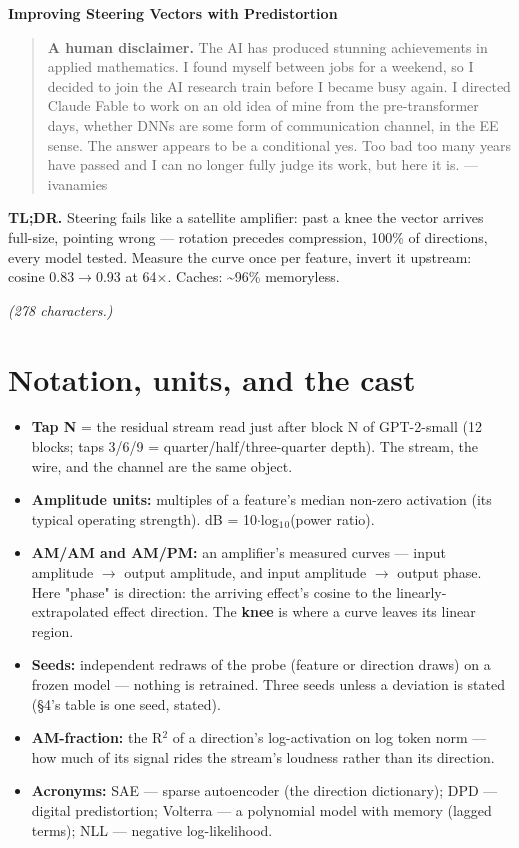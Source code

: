 \documentclass[10pt]{article}
\begin{document}
\begin{center}{\LARGE\bfseries Improving Steering Vectors with Predistortion}\end{center}

\begin{quote}\textbf{A human disclaimer.} The AI has produced stunning achievements in applied mathematics. I found myself between jobs for a weekend, so I decided to join the AI research train before I became busy again. I directed Claude Fable to work on an old idea of mine from the pre-transformer days, whether DNNs are some form of communication channel, in the EE sense. The answer appears to be a conditional yes. Too bad too many years have passed and I can no longer fully judge its work, but here it is. --- ivanamies\end{quote}

\textbf{TL;DR.} Steering fails like a satellite amplifier: past a knee the vector arrives full-size, pointing
wrong --- rotation precedes compression, 100\% of directions, every model tested. Measure the curve
once per feature, invert it upstream: cosine 0.83$\to$0.93 at 64$\times$. Caches: \textasciitilde{}96\% memoryless.

\emph{(278 characters.)}

\section{Notation, units, and the cast}

\begin{itemize}\setlength\itemsep{1pt}
\item \textbf{Tap N} = the residual stream read just after block N of GPT-2-small (12 blocks; taps 3/6/9 = quarter/half/three-quarter depth). The stream, the wire, and the channel are the same object.
\item \textbf{Amplitude units:} multiples of a feature's median non-zero activation (its typical operating strength). dB = 10$\cdot$log$_{1}$$_{0}$(power ratio).
\item \textbf{AM/AM and AM/PM:} an amplifier's measured curves --- input amplitude $\to$ output amplitude, and input amplitude $\to$ output phase. Here "phase" is direction: the arriving effect's cosine to the linearly-extrapolated effect direction. The \textbf{knee} is where a curve leaves its linear region.
\item \textbf{Seeds:} independent redraws of the probe (feature or direction draws) on a frozen model --- nothing is retrained. Three seeds unless a deviation is stated (§4's table is one seed, stated).
\item \textbf{AM-fraction:} the R$^{2}$ of a direction's log-activation on log token norm --- how much of its signal rides the stream's loudness rather than its direction.
\item \textbf{Acronyms:} SAE --- sparse autoencoder (the direction dictionary); DPD --- digital predistortion; Volterra --- a polynomial model with memory (lagged terms); NLL --- negative log-likelihood.
\end{itemize}
\end{document}
